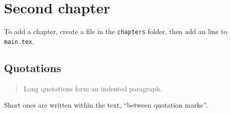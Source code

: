 \chapter{Second chapter}
\label{chap:second}

To add a chapter, create a file in the \texttt{chapters} folder, then add an
\verb|| line to \texttt{main.tex}.

\section{Quotations}

\begin{quote}
Long quotations form an indented paragraph.
\end{quote}

Short ones are written within the text, \enquote{between quotation marks}.

